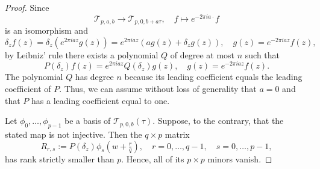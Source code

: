 \documentclass[10pt,a4paper]{amsart}
\newcommand{\calT}{\mathcal T}
\newcommand{\dd}{\delta}
\theoremstyle{plain}
\begin{document}
\begin{proof}
{
Since 
\begin{equation}
    \calT_{p,a,b}\to \calT_{p,0,b+a\tau}, \quad f\mapsto e^{-2\pi i a\cdot} f
\end{equation}
is an isomorphism and 
\begin{equation}
    \dd_z f(z) = \dd_z \left(e^{2\pi i az}g(z)\right)= e^{2\pi i a z}(a g(z) + \dd_z g(z)),\quad g(z) = e^{-2\pi i az} f(z),
\end{equation}
by Leibniz' rule there exists a polynomial $Q$ of degree at most $n$ such that
\begin{equation}\label{eq:P_vs_Q_for_a}
    P(\dd_z) f (z) = e^{2\pi i a z} Q(\dd_z) g(z),\quad g(z) = e^{-2\pi i az} f(z). 
\end{equation}
The polynomial $Q$ has degree $n$ because its leading coefficient equals the leading coefficient of $P$. Thus, we can assume without loss of generality that $a=0$ and that $P$ has a leading coefficient equal to one.
}

{Let $\phi_0,\dots,\phi_{p-1}$ be a basis of $\calT_{p,0,b}(\tau)$.}  Suppose, to
the contrary, that the stated map is not injective.  Then the
$q\times p$ matrix
$$
R_{r,s}:={{P(\dd_z)}}\phi_s\left(w+\tfrac{r}{q}\right),
\quad
r=0,\dots,q-1,
\quad
s=0,\dots,p-1,
$$
has rank strictly smaller than $p$.  Hence, all of its $p\times p$ minors
vanish.


\end{proof}
\end{document}
